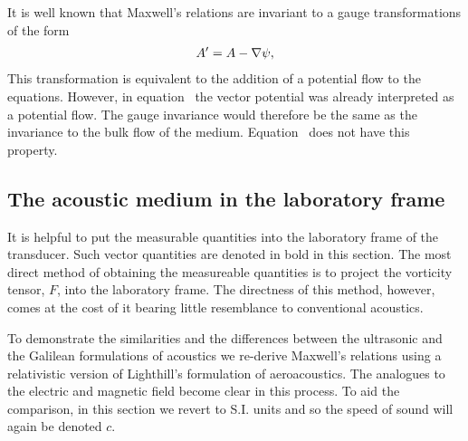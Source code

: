 It is well known that Maxwell's relations are invariant to a gauge transformations of the form
\begin{align}
A^\prime = A - \nabla \psi,
\end{align}
This transformation is equivalent to the addition of a potential flow to the equations.
However, in equation~ the vector potential was already interpreted as a potential flow.
The gauge invariance would therefore be the same as the  invariance to the bulk flow of the medium.
Equation~ does not have this property.






\subsection{The acoustic medium in the laboratory frame}\label{sec:int:EM}

It is helpful to put the measurable quantities into the laboratory frame of the transducer.
Such vector quantities are denoted in bold in this section.
The most direct method of obtaining the measureable quantities
is to project the vorticity tensor, $F$, into the laboratory  frame\cite{Hestenes2003, Doran2003}.
The directness of this method, however, comes at the cost of it bearing little  resemblance to conventional acoustics.

To demonstrate the similarities and the differences between  the ultrasonic and the Galilean  formulations of acoustics
we re-derive Maxwell's relations using a relativistic version of Lighthill's formulation of aeroacoustics\cite{Lighthill1952}.
The analogues to the electric and magnetic field  become clear in this process.
To aid the comparison, in this section we revert to S.I. units and so the speed of sound will again be denoted $c$.


